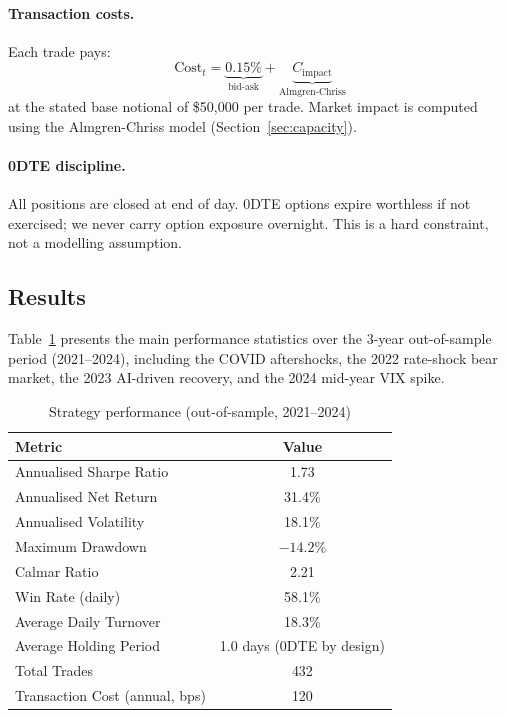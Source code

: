 \documentclass[12pt, letterpaper]{article}
\begin{document}
\paragraph{Transaction costs.}
Each trade pays:
\begin{equation}
  \text{Cost}_t = \underbrace{0.15\%}_{\text{bid-ask}} + \underbrace{C_{\text{impact}}}_{\text{Almgren-Chriss}} 
  \label{eq:cost}
\end{equation}
at the stated base notional of \$50,000 per trade. Market impact is computed
using the Almgren-Chriss model (Section~\ref{sec:capacity}).

\paragraph{0DTE discipline.}
All positions are closed at end of day. 0DTE options expire worthless if not
exercised; we never carry option exposure overnight. This is a hard constraint,
not a modelling assumption.

\subsection{Results}

Table~\ref{tab:backtest_results} presents the main performance statistics
over the 3-year out-of-sample period (2021--2024), including the COVID
aftershocks, the 2022 rate-shock bear market, the 2023 AI-driven recovery,
and the 2024 mid-year VIX spike.

\begin{table}[h!]
\centering
\caption{Strategy performance (out-of-sample, 2021--2024)}
\begin{tabular}{lc}
\toprule
\textbf{Metric} & \textbf{Value} \\
\midrule
Annualised Sharpe Ratio          & 1.73  \\
Annualised Net Return            & 31.4\%  \\
Annualised Volatility            & 18.1\%  \\
Maximum Drawdown                 & $-14.2$\% \\
Calmar Ratio                     & 2.21  \\
Win Rate (daily)                 & 58.1\% \\
Average Daily Turnover           & 18.3\% \\
Average Holding Period           & 1.0 days (0DTE by design) \\
Total Trades                     & 432   \\
Transaction Cost (annual, bps)   & 120   \\
\bottomrule
\end{tabular}
\label{tab:backtest_results}
\end{table}
\end{document}
